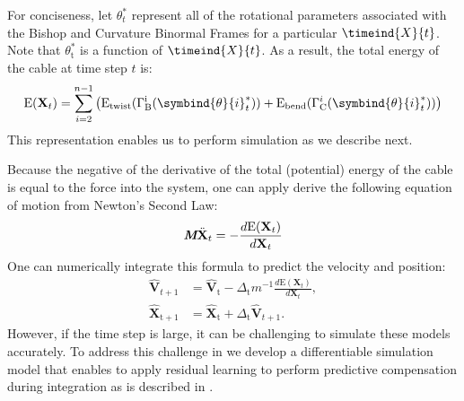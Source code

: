 For conciseness, let $\theta_t^*$ represent all of the rotational parameters associated with the Bishop and Curvature Binormal Frames for a particular $\timeind{X}{t}$. 
Note that $\theta^*_\text{t}$ is a function of $\timeind{X}{t}$. 
As a result, the total energy of the cable at time step $t$ is:
\begin{equation}
    \text{E}(\textbf{X}_t) = \sum^{n-1}_{i=2} \left(\text{E}_{\text{twist}}(\Gamma_\text{B}^\text{i}(\symbind{\theta}{i}_t^*)) + \text{E}_{\text{bend}}(\Gamma_\text{C}^{i}(\symbind{\theta}{i}_t^*))\right) 
    \label{eq:energy}
\end{equation}
This representation enables us to perform simulation as we describe next.


Because the negative of the derivative of the total (potential) energy of the cable is equal to the force into the system, one can apply derive the following equation of motion from Newton's Second Law:
\begin{equation}
       \textit{\textbf{M}}\ddot{\textbf{X}}_{t} = -\frac{d\text{E}(\textbf{X}_t)}{d \textbf{X}_{t}}
       \label{eq:Integration}
\end{equation}
One can numerically integrate this formula to predict the velocity and position:
\begin{align}
        \hat{\textbf{V}}_{t+1} &= \hat{\textbf{V}}_\text{t}-\Delta_\text{t}m^{-1}\frac{d\text{E}(\textbf{X}_t)}{d \textbf{X}_{t}}, \\  
        \hat{\textbf{X}}_{\text{t}+1} &= \hat{\textbf{X}}_\text{t} + \Delta_\text{t}\hat{\textbf{V}}_{t+1}.
       \label{eq:Semi-Euler}
\end{align}
However, if the time step is large, it can be challenging to simulate these models accurately.
To address this challenge in  we develop a differentiable simulation model that enables to apply residual learning to perform predictive compensation during integration as is described in .

